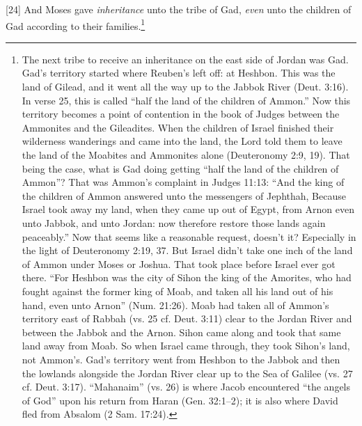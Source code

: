 [24] \textcolor[rgb]{0.00,0.00,1.00}{And Moses gave \emph{inheritance} unto the tribe of Gad, \emph{even} unto the children of Gad according to their families.}\footnote{The next tribe to receive an inheritance on
the east side of Jordan was Gad. Gad’s territory
started where Reuben’s left off: at Heshbon.
This was the land of Gilead, and it went all the
way up to the Jabbok River (Deut. 3:16). In
verse 25, this is called ``half the land of the
children of Ammon.'' Now this territory becomes a point of contention in the book of Judges between the Ammonites and the Gileadites. When the children of Israel finished their wilderness wanderings and came into the land, the Lord told them to leave the land of the Moabites and Ammonites alone (Deuteronomy 2:9, 19). That being the case, what is Gad doing getting ``half the land of the children of Ammon''? That was Ammon’s complaint in Judges 11:13: “And the king of the children of Ammon answered unto the messengers of Jephthah, Because Israel took away my land, when they came up out of Egypt, from Arnon even unto Jabbok, and unto Jordan: now therefore restore those lands again peaceably.” Now that seems like a reasonable request,
doesn’t it? Especially in the light of
Deuteronomy 2:19, 37. But Israel didn’t take
one inch of the land of Ammon under Moses or
Joshua. That took place before Israel ever got
there. “For Heshbon was the city of Sihon the
king of the Amorites, who had fought against
the former king of Moab, and taken all his
land out of his hand, even unto Arnon”
(Num. 21:26).
Moab had taken all of Ammon’s territory
east of Rabbah (vs. 25 cf. Deut. 3:11) clear to
the Jordan River and between the Jabbok and
the Arnon. Sihon came along and took that
same land away from Moab. So when Israel
came through, they took Sihon’s land, not
Ammon’s.
Gad’s territory went from Heshbon to the
Jabbok and then the lowlands alongside the
Jordan River clear up to the Sea of Galilee (vs.
27 cf. Deut. 3:17). “Mahanaim” (vs. 26) is
where Jacob encountered “the angels of God”
upon his return from Haran (Gen. 32:1–2); it is
also where David fled from Absalom (2 Sam.
17:24).}
